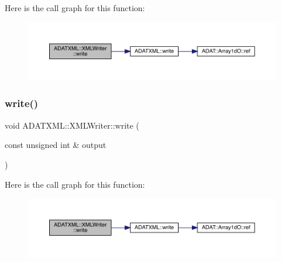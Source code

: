 Here is the call graph for this function\+:\nopagebreak
\begin{figure}[H]
\begin{center}
\leavevmode
\includegraphics[width=350pt]{da/da7/classADATXML_1_1XMLWriter_aa027c8bf616bdc96982bb11a2610469e_cgraph}
\end{center}
\end{figure}
\mbox{\label{classADATXML_1_1XMLWriter_a36ebb7ce3a0fde310c457c9520ca961e}} 
\subsubsection{\texorpdfstring{write()}{write()}\hspace{0.1cm}{\footnotesize\ttfamily [5/20]}}
{\footnotesize\ttfamily void A\+D\+A\+T\+X\+M\+L\+::\+X\+M\+L\+Writer\+::write (\begin{DoxyParamCaption}\item[{const unsigned int \&}]{output }\end{DoxyParamCaption})}

Here is the call graph for this function\+:\nopagebreak
\begin{figure}[H]
\begin{center}
\leavevmode
\includegraphics[width=350pt]{da/da7/classADATXML_1_1XMLWriter_a36ebb7ce3a0fde310c457c9520ca961e_cgraph}
\end{center}
\end{figure}
\mbox{\label{classADATXML_1_1XMLWriter_a36ebb7ce3a0fde310c457c9520ca961e}} 
